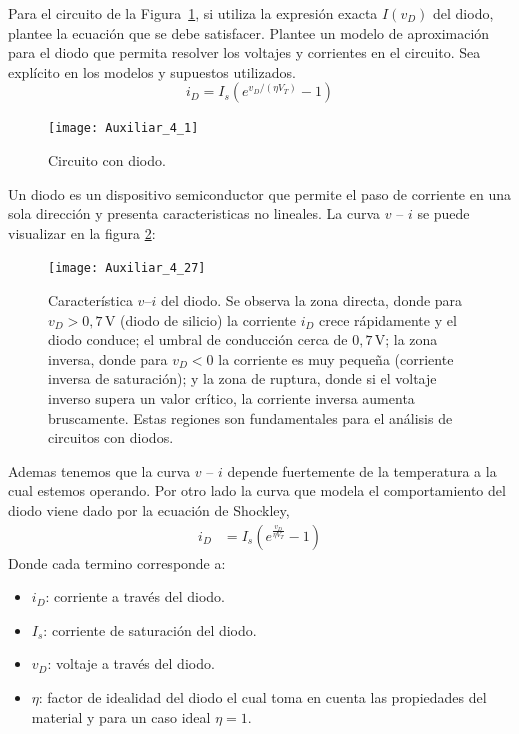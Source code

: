 \documentclass[
  11pt,
  letterpaper,
   addpoints,
   answers
  ]{exam}
\begin{document}
\begin{questions}
\question
Para el circuito de la Figura~\ref{fig:1}, si utiliza la expresión exacta $I(v_D)$ del diodo, plantee la ecuación que se debe satisfacer. Plantee un modelo de aproximación para el diodo que permita resolver los voltajes y corrientes en el circuito. Sea explícito en los modelos y supuestos utilizados.
\begin{equation}
  i_D = I_s \left( e^{v_D/(\eta V_T)} - 1 \right)
\end{equation}

\begin{figure}[H]
    \centering
    \texttt{[image: Auxiliar\_4\_1]}
    \caption{Circuito con diodo.}
    \label{fig:1}
\end{figure}
\newpage
\begin{solution}
Un diodo es un dispositivo semiconductor que permite el paso de corriente en una sola dirección y presenta caracteristicas no lineales. La curva $v$ -- $i$ se puede visualizar en la figura \ref{fig:th_norton_1}:
\begin{figure}[H]
    \centering
    \texttt{[image: Auxiliar\_4\_27]}
  \caption{Característica $v$--$i$ del diodo. Se observa la zona directa, donde para $v_D > 0{,}7\,$V (diodo de silicio) la corriente $i_D$ crece rápidamente y el diodo conduce; el umbral de conducción cerca de $0{,}7\,$V; la zona inversa, donde para $v_D < 0$ la corriente es muy pequeña (corriente inversa de saturación); y la zona de ruptura, donde si el voltaje inverso supera un valor crítico, la corriente inversa aumenta bruscamente. Estas regiones son fundamentales para el análisis de circuitos con diodos.}
    \label{fig:th_norton_1}
\end{figure}
Ademas tenemos que la curva $v$ -- $i$ depende fuertemente de la temperatura a la cual estemos operando. Por otro lado la curva que modela el comportamiento del diodo viene dado por la ecuación de Shockley,
\begin{align}
    i_D &= I_s\left(e^{\frac{v_D}{\eta V_T}} - 1\right) 
\end{align}
Donde cada termino corresponde a:
\begin{itemize}
    \item $i_D$: corriente a través del diodo.
    \item $I_s$: corriente de saturación del diodo.
    \item $v_D$: voltaje a través del diodo.
    \item $\eta$: factor de idealidad del diodo el cual toma en cuenta las propiedades del material y para un caso ideal $\eta = 1$.

\end{itemize}
\end{solution}
\end{questions}
\end{document}
